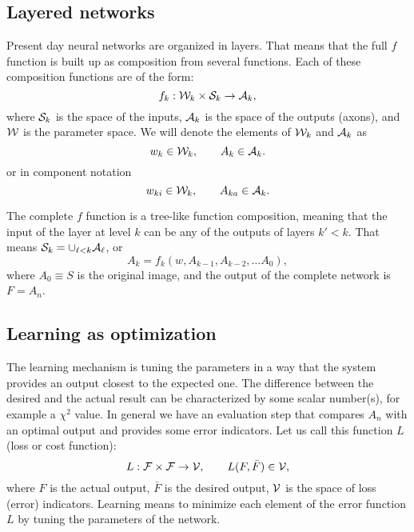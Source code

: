 \documentclass{article}
\begin{document}
\subsection{Layered networks}

Present day neural networks are organized in layers. That means that
the full $f$ function is built up as composition from several
functions. Each of these composition functions are of the form:
\begin{equation}
  \label{eq:layer}
  f_k : {\cal W}_k \times {\cal S}_k \to {\cal A}_k,
\end{equation}
where ${\cal S}_k$ is the space of the inputs,
${\cal A}_k$ is the space of the outputs (axons), and ${\cal W}$ is
the parameter space. We will denote the elements of ${\cal W}_k$ and
${\cal A}_k$ as
\begin{equation}
  w_{k}\in {\cal W}_k,\qquad   A_{k} \in {\cal A}_k.
\end{equation}
or in component notation
\begin{equation}
  w_{ki}\in {\cal W}_k,\qquad   A_{ka} \in {\cal A}_k.
\end{equation}

The complete $f$ function is a tree-like function composition, meaning
that the input of the layer at level $k$ can be any of the outputs of
layers $k'<k$. That means ${\cal S}_k=\cup_{\ell<k}{\cal A}_\ell$, or
\begin{equation}
  \label{eq:rec}
  A_k = f_k(w, A_{k-1},A_{k-2},\dots A_0),
\end{equation}
where $A_0\equiv S$ is the original image, and the output of the
complete network is $F=A_n$.

\subsection{Learning as optimization}

The learning mechanism is tuning the parameters in a way that the
system provides an output closest to the expected one. The difference
between the desired and the actual result can be characterized by some
scalar number(s), for example a $\chi^2$ value. In general we have an
evaluation step that compares $A_n$ with an optimal output and
provides some error indicators. Let us call this function $L$ (loss or
cost function):
\begin{equation}
  L : {\cal F}\times {\cal F} \to {\cal V},\qquad L(F,\bar F)\in{\cal
    V}, 
\end{equation}
where $F$ is the actual output, $\bar F$ is the desired output,
${\cal V}$ is the space of loss (error) indicators. Learning means to
minimize each element of the error function $L$ by tuning the
parameters of the network.
\end{document}
